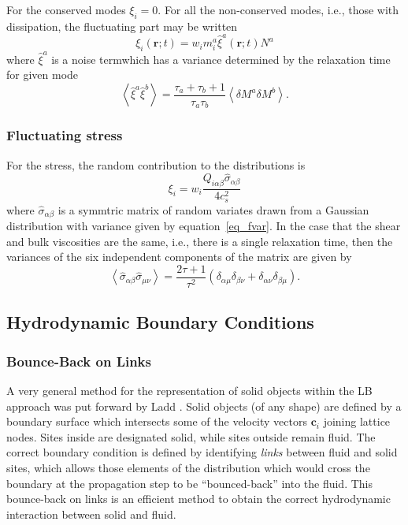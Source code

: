 For the conserved modes $\xi_i = 0$. For all the non-conserved modes,
i.e., those with dissipation, the fluctuating part may be written
\begin{equation}
\xi_i (\mathbf{r}; t) = w_i m_i^a \hat{\xi}^a (\mathbf{r}; t) N^a
\end{equation}
where $\hat{\xi}^a$ is a noise termwhich has a variance determined
by the relaxation time for given mode
\begin{equation}
\left< \hat{\xi}^a \hat{\xi}^b \right> =
\frac{\tau_a + \tau_b + 1}{\tau_a \tau_b}
\left< \delta M^a \delta M^b \right>.
\label{eq_fvar}
\end{equation}

\subsubsection{Fluctuating stress}

For the stress, the random contribution to the distributions is
\begin{equation}
\xi_i = w_i \frac{Q_{i\alpha\beta} \hat{\sigma}_{\alpha\beta}}{4c_s^2}
\end{equation}
where $\hat{\sigma}_{\alpha\beta}$ is a symmtric matrix of random
variates drawn from a Gaussian distribution with variance given
by equation~\ref{eq_fvar}. In the case that the shear and bulk
viscosities are the same, i.e., there is a single relaxation
time, then the variances of the six independent components of
the matrix are given by
\begin{equation}
\left< \hat{\sigma}_{\alpha\beta} \hat{\sigma}_{\mu\nu} \right> =
\frac{2\tau + 1}{\tau^2}
(\delta_{\alpha\mu}\delta_{\beta\nu} + \delta_{\alpha\nu} \delta_{\beta\mu}).
\end{equation}


\subsection{Hydrodynamic Boundary Conditions}

\subsubsection{Bounce-Back on Links}

A very general method for the representation of solid objects
within the LB approach was put forward by Ladd \cite{l94a, l94b}.
Solid objects (of any shape) are defined by a boundary surface
which intersects some of the velocity vectors $\mathbf{c}_i$
joining lattice nodes. Sites inside are designated solid, while
sites outside remain fluid. The correct boundary condition is
defined by identifying \textit{links} between fluid and solid
sites, which allows those elements of the distribution which would
cross the boundary at the propagation step to be ``bounced-back''
into the fluid. This bounce-back on links is an efficient method
to obtain the  correct hydrodynamic interaction between solid
and fluid.

